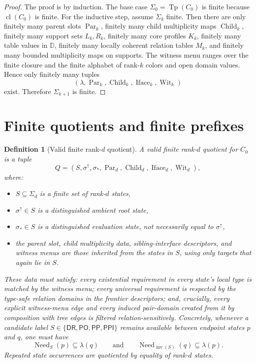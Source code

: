 \documentclass[11pt]{article}
\newtheorem{definition}{Definition}[section]
\theoremstyle{remark}
\newcommand{\DR}{\mathsf{DR}}
\newcommand{\PO}{\mathsf{PO}}
\newcommand{\PP}{\mathsf{PP}}
\newcommand{\PPI}{\mathsf{PPI}}
\newcommand{\RCC}{\{\DR,\PO,\PP,\PPI\}}
\newcommand{\cl}{\operatorname{cl}}
\newcommand{\Tp}{\operatorname{Tp}}
\newcommand{\Child}{\operatorname{Child}}
\newcommand{\Iface}{\operatorname{Iface}}
\newcommand{\Wit}{\operatorname{Wit}}
\newcommand{\Par}{\operatorname{Par}}
\newcommand{\Need}{\operatorname{Need}}
\newcommand{\inv}{\operatorname{inv}}
\newcommand{\OpenDom}{\mathbb{D}}
\begin{document}
\begin{proof}
The proof is by induction. The base case $\Sigma_0=\Tp(C_0)$ is finite because $\cl(C_0)$ is finite. For the inductive step, assume $\Sigma_k$ finite. Then there are only finitely many parent slots $\Par_k$, finitely many child multiplicity maps $\Child_k$, finitely many support sets $L_k,R_k$, finitely many core profiles $K_k$, finitely many table values in $\OpenDom$, finitely many locally coherent relation tables $M_k$, and finitely many bounded multiplicity maps on supports. The witness menu ranges over the finite closure and the finite alphabet of rank-$k$ colors and open domain values. Hence only finitely many tuples
\[
(\lambda,\Par_k,\Child_k,\Iface_k,\Wit_k)
\]
exist. Therefore $\Sigma_{k+1}$ is finite.
\end{proof}

\section{Finite quotients and finite prefixes}

\begin{definition}[Valid finite rank-$d$ quotient]\label{def:valid-quotient}
A \emph{valid finite rank-$d$ quotient} for $C_0$ is a tuple
\[
Q=(S,\sigma^{\uparrow},\sigma_{\ast},\Par_d,\Child_d,\Iface_d,\Wit_d),
\]
where:
\begin{itemize}
    \item $S\subseteq \Sigma_d$ is a finite set of rank-$d$ states,
    \item $\sigma^{\uparrow}\in S$ is a distinguished \emph{ambient root state},
    \item $\sigma_{\ast}\in S$ is a distinguished \emph{evaluation state}, not necessarily equal to $\sigma^{\uparrow}$,
    \item the parent slot, child multiplicity data, sibling-interface descriptors, and witness menus are those inherited from the states in $S$, using only targets that again lie in $S$.
\end{itemize}
These data must satisfy: every existential requirement in every state's local type is matched by the witness menu; every universal requirement is respected by the type-safe relation domains in the frontier descriptors; and, crucially, every explicit witness-menu edge and every induced pair-domain created from it by composition with tree edges is filtered relation-sensitively. Concretely, whenever a candidate label $S\in\RCC$ remains available between endpoint states $p$ and $q$, one must have
\[
\Need_S(p)\subseteq \lambda(q)
\qquad\text{and}\qquad
\Need_{\inv(S)}(q)\subseteq \lambda(p).
\]
Repeated state occurrences are quotiented by equality of rank-$d$ states.
\end{definition}
\end{document}
